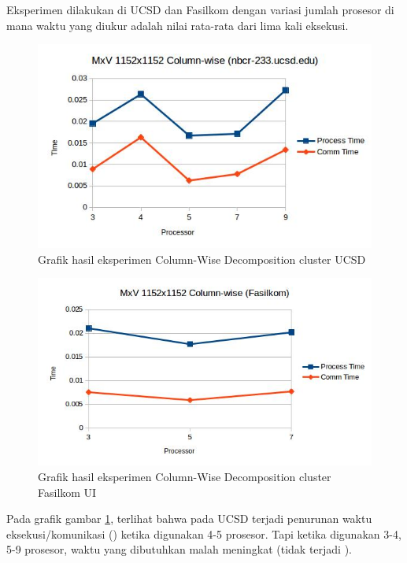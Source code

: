 Eksperimen dilakukan di \cluster UCSD dan Fasilkom dengan variasi jumlah prosesor di mana waktu yang diukur adalah nilai rata-rata dari lima kali eksekusi.

\begin{figure}
	\centering
	\includegraphics[width=1\textwidth]
	{pics/chart_mv_colwise_nbcr}
	\caption{Grafik hasil eksperimen Column-Wise Decomposition cluster UCSD}
	\label{fig:result_mv_colwise_nbcr}
\end{figure}  

\begin{figure}
	\centering
	\includegraphics[width=1\textwidth]
	{pics/chart_mv_colwise_fasilkom}
	\caption{Grafik hasil eksperimen Column-Wise Decomposition cluster Fasilkom UI}
	\label{fig:result_mv_colwise_fasilkom}
\end{figure}  

Pada grafik gambar \ref{fig:result_mv_colwise_nbcr}, terlihat bahwa pada \cluster UCSD terjadi penurunan waktu eksekusi/komunikasi (\speedup) ketika digunakan 4-5 prosesor. Tapi ketika digunakan 3-4, 5-9 prosesor, waktu yang dibutuhkan malah meningkat (tidak terjadi \speedup).

